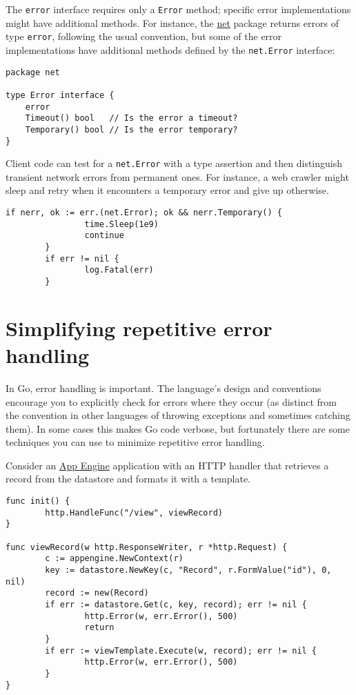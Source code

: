 The \texttt{error} interface requires only a \texttt{Error} method;
specific error implementations might have additional methods. For
instance, the \href{http://golang.org/pkg/net/}{net} package returns errors of type
\texttt{error}, following the usual convention, but some of the error
implementations have additional methods defined by the
\texttt{net.Error} interface:

\begin{Verbatim}[frame=single]
package net

type Error interface {
    error
    Timeout() bool   // Is the error a timeout?
    Temporary() bool // Is the error temporary?
}
\end{Verbatim}

Client code can test for a \texttt{net.Error} with a type assertion and
then distinguish transient network errors from permanent ones. For
instance, a web crawler might sleep and retry when it encounters a
temporary error and give up otherwise.

\begin{Verbatim}[frame=single]
        if nerr, ok := err.(net.Error); ok && nerr.Temporary() {
                time.Sleep(1e9)
                continue
        }
        if err != nil {
                log.Fatal(err)
        }
\end{Verbatim}

\section*{Simplifying repetitive error handling}

In Go, error handling is important. The language's design and
conventions encourage you to explicitly check for errors where they
occur (as distinct from the convention in other languages of throwing
exceptions and sometimes catching them). In some cases this makes Go
code verbose, but fortunately there are some techniques you can use to
minimize repetitive error handling.

Consider an \href{http://code.google.com/appengine/docs/go/}{App Engine}
application with an HTTP handler that retrieves a record from the
datastore and formats it with a template.

\begin{Verbatim}[frame=single]
func init() {
        http.HandleFunc("/view", viewRecord)
}

func viewRecord(w http.ResponseWriter, r *http.Request) {
        c := appengine.NewContext(r)
        key := datastore.NewKey(c, "Record", r.FormValue("id"), 0, nil)
        record := new(Record)
        if err := datastore.Get(c, key, record); err != nil {
                http.Error(w, err.Error(), 500)
                return
        }
        if err := viewTemplate.Execute(w, record); err != nil {
                http.Error(w, err.Error(), 500)
        }
}
\end{Verbatim}

